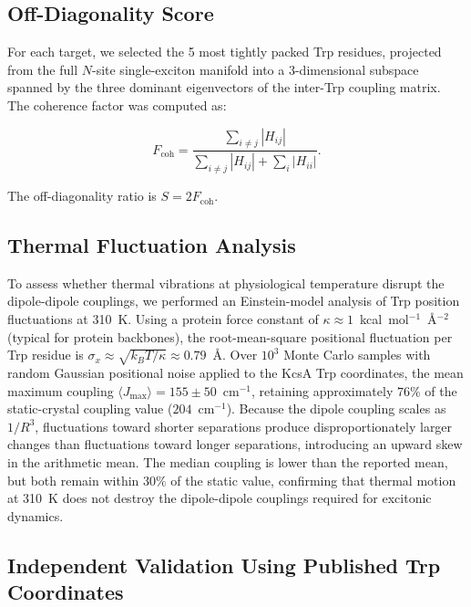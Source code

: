 \documentclass[aps,pre,twocolumn,showpacs,superscriptaddress]{revtex4-2}
\begin{document}
\subsection{Off-Diagonality Score}

For each target, we selected the 5 most tightly packed Trp residues, projected from the full $N$-site single-exciton manifold into a 3-dimensional subspace spanned by the three dominant eigenvectors of the inter-Trp coupling matrix. The coherence factor was computed as:

\[
F_{\mathrm{coh}} = \frac{\sum_{i\neq j} |H_{ij}|}{\sum_{i\neq j} |H_{ij}| + \sum_i |H_{ii}|}.
\]

The off-diagonality ratio is $S = 2 F_{\mathrm{coh}}$.

\subsection{Thermal Fluctuation Analysis}

To assess whether thermal vibrations at physiological temperature disrupt the dipole-dipole couplings, we performed an Einstein-model analysis of Trp position fluctuations at 310~K. Using a protein force constant of $\kappa \approx 1$~kcal~mol$^{-1}$~\AA$^{-2}$ (typical for protein backbones), the root-mean-square positional fluctuation per Trp residue is $\sigma_x \approx \sqrt{k_B T / \kappa} \approx 0.79$~\AA. Over $10^3$ Monte Carlo samples with random Gaussian positional noise applied to the KcsA Trp coordinates, the mean maximum coupling $\langle J_{\max} \rangle = 155 \pm 50$~cm$^{-1}$, retaining approximately $76\%$ of the static-crystal coupling value ($204$~cm$^{-1}$). Because the dipole coupling scales as $1/R^3$, fluctuations toward shorter separations produce disproportionately larger changes than fluctuations toward longer separations, introducing an upward skew in the arithmetic mean. The median coupling is lower than the reported mean, but both remain within $30\%$ of the static value, confirming that thermal motion at 310~K does not destroy the dipole-dipole couplings required for excitonic dynamics.

\subsection{Independent Validation Using Published Trp Coordinates}
\end{document}
